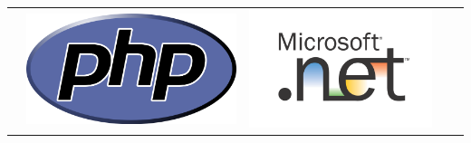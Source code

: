 \documentclass[a4paper,12pt,openany,oneside]{book}
\begin{document}
\begin{table}
\begin{tabular}{| l | l | l | l | l |}
\hline
 & \includegraphics[scale=0.08]{images/icons/php.png} & \includegraphics[scale=0.08]{images/icons/net.png} & \includegraphics[scale
\end{tabular}
\end{table}
\end{document}

